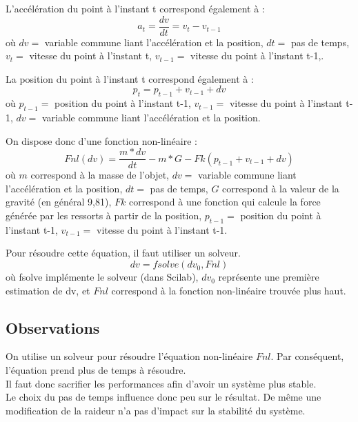 \documentclass[a4paper]{article}
\begin{document}
L'accélération du point à l'instant t correspond également à :
\begin{equation}
  a_t = \frac{dv}{dt} = v_t - v_{t-1}
\end{equation}
où $dv =$ variable commune liant l'accélération et la position, $dt =$ pas de temps, $v_t =$ vitesse du point à l'instant t, $v_{t-1} =$ vitesse du point à l'instant t-1,.

La position du point à l'instant t correspond également à :
\begin{equation}
  p_t = p_{t-1} + v_{t-1} + dv
\end{equation}
où $p_{t-1} =$ position du point à l'instant t-1, $v_{t-1} =$ vitesse du point à l'instant t-1, $dv =$ variable commune liant l'accélération et la position.

On dispose donc d'une fonction non-linéaire :
\begin{equation}
  Fnl(dv) = \frac{m * dv}{dt} - m * G - Fk( p_{t-1} + v_{t-1} + dv )
\end{equation}
où $m$ correspond à la masse de l'objet, $dv =$ variable commune liant l'accélération et la position, $dt =$ pas de temps, $G$ correspond à la valeur de la gravité (en général 9,81), $Fk$ correspond à une fonction qui calcule la force générée par les ressorts à partir de la position, $p_{t-1} =$ position du point à l'instant t-1, $v_{t-1} =$ vitesse du point à l'instant t-1.

Pour résoudre cette équation, il faut utiliser un solveur.
\begin{equation}
  dv = fsolve(dv_0, Fnl)
\end{equation}
où fsolve implémente le solveur (dans Scilab), $dv_0$ représente une première estimation de dv, et $Fnl$ correspond à la fonction non-linéaire trouvée plus haut.

\subsection{Observations}

On utilise un solveur pour résoudre l'équation non-linéaire $Fnl$.
Par conséquent, l'équation prend plus de temps à résoudre.\\
Il faut donc sacrifier les performances afin d'avoir un système plus stable.\\

Le choix du pas de temps influence donc peu sur le résultat. De même une modification de la raideur n'a pas d'impact sur la stabilité du système.
\end{document}
